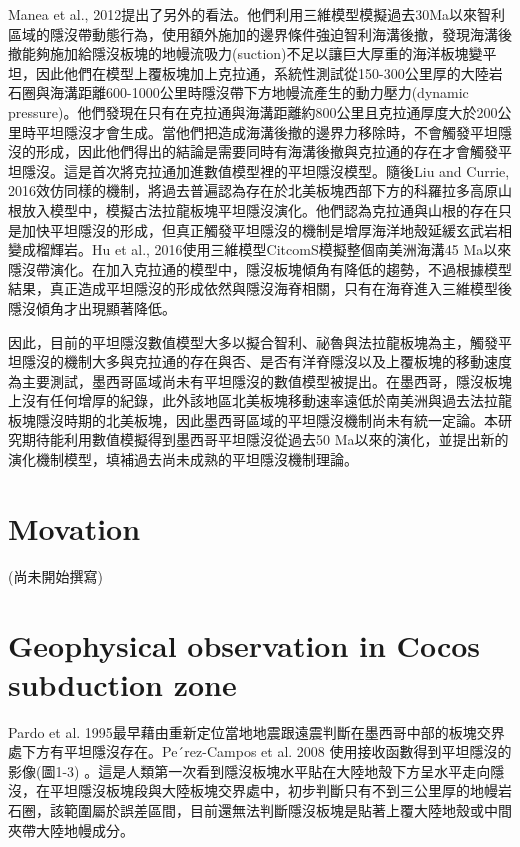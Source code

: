 Manea et al., 2012提出了另外的看法。他們利用三維模型模擬過去30Ma以來智利區域的隱沒帶動態行為，使用額外施加的邊界條件強迫智利海溝後撤，發現海溝後撤能夠施加給隱沒板塊的地幔流吸力(suction)不足以讓巨大厚重的海洋板塊變平坦，因此他們在模型上覆板塊加上克拉通，系統性測試從150-300公里厚的大陸岩石圈與海溝距離600-1000公里時隱沒帶下方地幔流產生的動力壓力(dynamic pressure)。他們發現在只有在克拉通與海溝距離約800公里且克拉通厚度大於200公里時平坦隱沒才會生成。當他們把造成海溝後撤的邊界力移除時，不會觸發平坦隱沒的形成，因此他們得出的結論是需要同時有海溝後撤與克拉通的存在才會觸發平坦隱沒。這是首次將克拉通加進數值模型裡的平坦隱沒模型。隨後Liu and Currie, 2016效仿同樣的機制，將過去普遍認為存在於北美板塊西部下方的科羅拉多高原山根放入模型中，模擬古法拉龍板塊平坦隱沒演化。他們認為克拉通與山根的存在只是加快平坦隱沒的形成，但真正觸發平坦隱沒的機制是增厚海洋地殼延緩玄武岩相變成榴輝岩。Hu et al., 2016使用三維模型CitcomS模擬整個南美洲海溝45 Ma以來隱沒帶演化。在加入克拉通的模型中，隱沒板塊傾角有降低的趨勢，不過根據模型結果，真正造成平坦隱沒的形成依然與隱沒海脊相關，只有在海脊進入三維模型後隱沒傾角才出現顯著降低。

因此，目前的平坦隱沒數值模型大多以擬合智利、祕魯與法拉龍板塊為主，觸發平坦隱沒的機制大多與克拉通的存在與否、是否有洋脊隱沒以及上覆板塊的移動速度為主要測試，墨西哥區域尚未有平坦隱沒的數值模型被提出。在墨西哥，隱沒板塊上沒有任何增厚的紀錄，此外該地區北美板塊移動速率遠低於南美洲與過去法拉龍板塊隱沒時期的北美板塊，因此墨西哥區域的平坦隱沒機制尚未有統一定論。本研究期待能利用數值模擬得到墨西哥平坦隱沒從過去50 Ma以來的演化，並提出新的演化機制模型，填補過去尚未成熟的平坦隱沒機制理論。

\section{Movation}

(尚未開始撰寫)

\section{Geophysical observation in Cocos subduction zone}

Pardo et al. 1995最早藉由重新定位當地地震跟遠震判斷在墨西哥中部的板塊交界處下方有平坦隱沒存在。Pe´rez-Campos et al. 2008 使用接收函數得到平坦隱沒的影像(圖1-3) 。這是人類第一次看到隱沒板塊水平貼在大陸地殼下方呈水平走向隱沒，在平坦隱沒板塊段與大陸板塊交界處中，初步判斷只有不到三公里厚的地幔岩石圈，該範圍屬於誤差區間，目前還無法判斷隱沒板塊是貼著上覆大陸地殼或中間夾帶大陸地幔成分。

